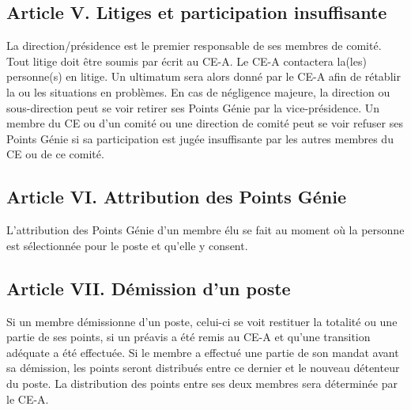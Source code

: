 \subsection*{Article V. Litiges et participation insuffisante}
La direction/présidence est le premier responsable de ses membres de comité. Tout litige doit être soumis par écrit au CE-A. Le CE-A contactera la(les) personne(s) en litige. Un ultimatum sera alors donné par le CE-A afin de rétablir la ou les situations en problèmes. En cas de négligence majeure, la direction ou sous-direction peut se voir retirer ses Points Génie par la vice-présidence. Un membre du CE ou d'un comité ou une direction de comité peut se voir refuser ses Points Génie si sa participation est jugée insuffisante par les autres membres du CE ou de ce comité.

\subsection*{Article VI. Attribution des Points Génie}
L’attribution des Points Génie d’un membre élu se fait au moment où la personne est sélectionnée pour le poste et qu’elle y consent.

\subsection*{Article VII. Démission d'un poste}
Si un membre démissionne d’un poste, celui-ci se voit restituer la totalité ou une partie de ses points, si un préavis a été remis au CE-A et qu'une transition adéquate a été effectuée. Si le membre a effectué une partie de son mandat avant sa démission, les points seront distribués entre ce dernier et le nouveau détenteur du poste. La distribution des points entre ses deux membres sera déterminée par le CE-A.
